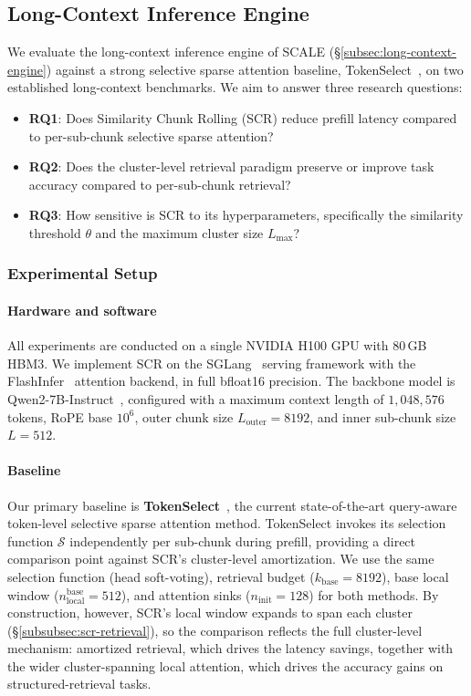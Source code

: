 \documentclass[10pt,conference]{IEEEtran}
\begin{document}
\subsection{Long-Context Inference Engine}
\label{subsec:exp-scr}

We evaluate the long-context inference engine of SCALE
(§\ref{subsec:long-context-engine}) against a strong selective sparse
attention baseline, TokenSelect~\cite{tokenselect2025}, on two 
established long-context benchmarks. We aim to answer three research 
questions:
\begin{itemize}
    \item \textbf{RQ1}: Does Similarity Chunk Rolling (SCR) reduce 
    prefill latency compared to per-sub-chunk selective sparse 
    attention?
    \item \textbf{RQ2}: Does the cluster-level retrieval paradigm 
    preserve or improve task accuracy compared to per-sub-chunk 
    retrieval?
    \item \textbf{RQ3}: How sensitive is SCR to its hyperparameters, 
    specifically the similarity threshold $\theta$ and the maximum 
    cluster size $L_{\max}$?
\end{itemize}

\subsubsection{Experimental Setup}
\label{subsec:exp-setup}

\paragraph{Hardware and software} 
All experiments are conducted on a single NVIDIA H100 GPU with
80\,GB HBM3. We implement SCR on the SGLang~\cite{zheng2024sglang}
serving framework with the FlashInfer~\cite{ye2025flashinfer} attention
backend, in full bfloat16 precision. The backbone model 
is Qwen2-7B-Instruct~\cite{yang2024qwen2}, configured with a maximum 
context length of $1{,}048{,}576$ tokens, RoPE base $10^6$, outer 
chunk size $L_{\text{outer}} = 8192$, and inner sub-chunk size 
$L = 512$.

\paragraph{Baseline} 
Our primary baseline is \textbf{TokenSelect}~\cite{tokenselect2025}, 
the current state-of-the-art query-aware token-level selective sparse 
attention method. TokenSelect invokes its selection function 
$\mathcal{S}$ independently per sub-chunk during prefill, providing 
a direct comparison point against SCR's cluster-level amortization. 
We use the same selection function (head soft-voting), retrieval
budget ($k_{\text{base}} = 8192$), base local window
($n_{\text{local}}^{\text{base}} = 512$), and attention sinks
($n_{\text{init}} = 128$) for both methods. By construction, however,
SCR's local window expands to span each cluster
(§\ref{subsubsec:scr-retrieval}), so the comparison reflects the full
cluster-level mechanism: amortized retrieval, which drives the latency
savings, together with the wider cluster-spanning local attention,
which drives the accuracy gains on structured-retrieval tasks.
\end{document}
